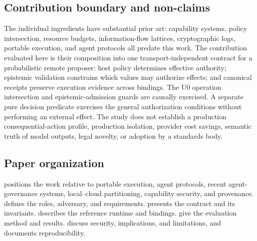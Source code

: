 \subsection{Contribution boundary and non-claims}
\label{sec:scope}
The individual ingredients have substantial prior art: capability systems, policy intersection, resource budgets, information-flow lattices, cryptographic logs, portable execution, and agent protocols all predate this work. The contribution evaluated here is their composition into one transport-independent contract for a probabilistic remote proposer: host policy determines effective authority; epistemic validation constrains which values may authorize effects; and canonical receipts preserve execution evidence across bindings. The U0 operation intersection and epistemic-admission guards are causally exercised. A separate pure decision predicate exercises the general authorization conditions without performing an external effect. The study does not establish a production consequential-action profile, production isolation, provider cost savings, semantic truth of model outputs, legal novelty, or adoption by a standards body.

\subsection{Paper organization}
 positions the work relative to portable execution, agent protocols, recent agent-governance systems, local--cloud partitioning, capability security, and provenance.  defines the roles, adversary, and requirements.  presents the contract and its invariants.  describes the reference runtime and bindings.  give the evaluation method and results.  discuss security, implications, and limitations, and  documents reproducibility.
